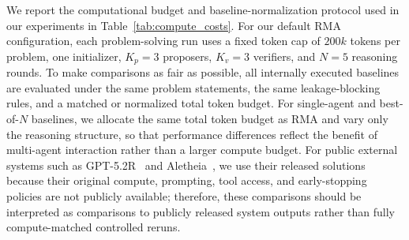 \documentclass{article}
\begin{document}
We report the computational budget and baseline-normalization protocol used in our experiments in Table~\ref{tab:compute_costs}. For our default RMA configuration, each problem-solving run uses a fixed token cap of $200k$ tokens per problem, one initializer, $K_p=3$ proposers, $K_v=3$ verifiers, and $N=5$ reasoning rounds. To make comparisons as fair as possible, all internally executed baselines are evaluated under the same problem statements, the same leakage-blocking rules, and a matched or normalized total token budget. For single-agent and best-of-$N$ baselines, we allocate the same total token budget as RMA and vary only the reasoning structure, so that performance differences reflect the benefit of multi-agent interaction rather than a larger compute budget. For public external systems such as GPT-5.2R~\citep{openai_first_proof_2025} and Aletheia~\citep{aletheia}, we use their released solutions because their original compute, prompting, tool access, and early-stopping policies are not publicly available; therefore, these comparisons should be interpreted as comparisons to publicly released system outputs rather than fully compute-matched controlled reruns.
\end{document}
